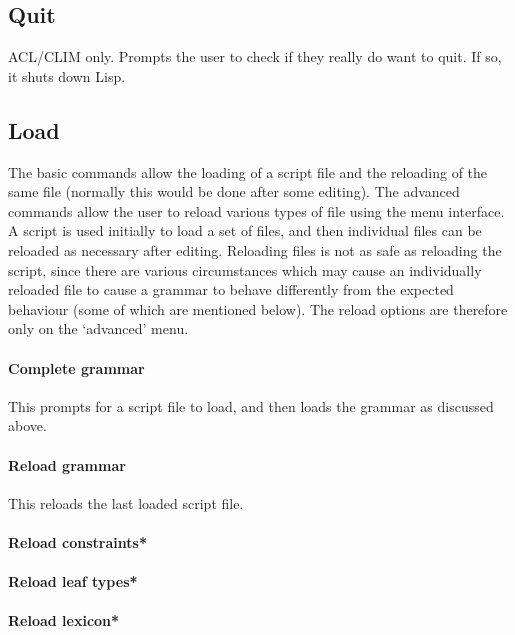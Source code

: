 \documentclass[12pt]{report}
\begin{document}
\subsection{Quit}

ACL/CLIM only.  Prompts the user to check if they really do want to
quit.  If so, it shuts down Lisp.

\subsection{Load}
\label{load}

The basic commands allow the loading of a script file
and the reloading of the same file (normally this
would be done after some editing).
The advanced 
commands allow the user to reload various types of file using the
menu interface.   
A script
is used initially to load a set of files, and then individual files
can be reloaded as necessary after editing.
Reloading files is not as safe as reloading the script, since there
are various circumstances which may cause an individually reloaded
file to cause a grammar to behave differently from the expected behaviour
(some of which are mentioned below).
The reload options are therefore only on the `advanced' menu.

\paragraph{Complete grammar}

This prompts for a script file to load, and then loads the 
grammar as discussed above.

\paragraph{Reload grammar}

This reloads the last loaded script file.

\paragraph{Reload constraints*}

\paragraph{Reload leaf types*}

\paragraph{Reload lexicon*}
\end{document}
